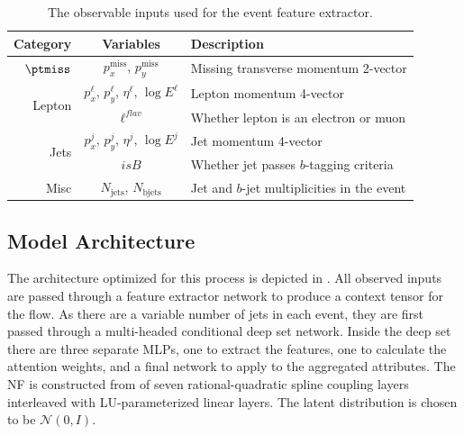 \begin{table}[ht]
    \caption{The observable inputs used for the event feature extractor.}
    \label{tab:inputs}
    \centering
    \begin{tabular}{r c l}
        \toprule
        Category                & Variables                                              & Description                                 \\
        \midrule
        $\ptmiss$               & $p_x^\text{miss}$, $p_y^\text{miss}$                   & Missing transverse momentum 2-vector        \\ [2ex]
        \multirow{2}{*}{Lepton} & $p_x^{\ell}$, $p_y^{\ell}$, $\eta^\ell$, $\log E^\ell$ & Lepton momentum 4-vector                    \\
                                & $\ell^{flav}$                                          & Whether lepton is an electron or muon       \\ [2ex]
        \multirow{2}{*}{Jets}   & $p_x^{j}$, $p_y^j$, $\eta^j$,  $\log E^j$              & Jet momentum 4-vector                       \\
                                & $isB$                                                  & Whether jet passes $b$-tagging criteria     \\ [2ex]
        Misc                    & $N_{\text{jets}}$, $N_{\text{bjets}}$                  & Jet and $b$-jet multiplicities in the event \\
        \bottomrule
    \end{tabular}
\end{table}

\subsection{Model Architecture}

The \vflows architecture optimized for this process is depicted in .
All observed inputs are passed through a feature extractor network to produce a context tensor for the flow.
As there are a variable number of jets in each event, they are first passed through a multi-headed conditional deep set network.
Inside the deep set there are three separate MLPs, one to extract the features, one to calculate the attention weights, and a final network to apply to the aggregated attributes.
The NF is constructed from of seven rational-quadratic spline coupling layers~\cite{NeuralSplineFlows} interleaved with LU-parameterized linear layers.
The latent distribution is chosen to be $\mathcal{N}(0, I)$.

